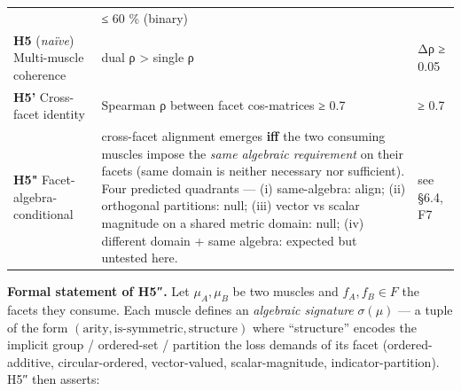 \begin{longtable}[]{@{}lll@{}}
\begin{minipage}[t]{0.52\columnwidth}
\end{minipage} & \begin{minipage}[t]{0.29\columnwidth}\raggedright
≤ 60 \% (binary)\strut
\end{minipage}\tabularnewline
\begin{minipage}[t]{0.10\columnwidth}\raggedright
\textbf{H5} (\emph{naïve}) Multi-muscle coherence\strut
\end{minipage} & \begin{minipage}[t]{0.52\columnwidth}\raggedright
dual ρ \textgreater{} single ρ\strut
\end{minipage} & \begin{minipage}[t]{0.29\columnwidth}\raggedright
Δρ ≥ 0.05\strut
\end{minipage}\tabularnewline
\begin{minipage}[t]{0.10\columnwidth}\raggedright
\textbf{H5'} Cross-facet identity\strut
\end{minipage} & \begin{minipage}[t]{0.52\columnwidth}\raggedright
Spearman ρ between facet cos-matrices ≥ 0.7\strut
\end{minipage} & \begin{minipage}[t]{0.29\columnwidth}\raggedright
≥ 0.7\strut
\end{minipage}\tabularnewline
\begin{minipage}[t]{0.10\columnwidth}\raggedright
\textbf{H5"} Facet-algebra-conditional\strut
\end{minipage} & \begin{minipage}[t]{0.52\columnwidth}\raggedright
cross-facet alignment emerges \textbf{iff} the two consuming muscles impose the \emph{same algebraic requirement} on their facets (same domain is neither necessary nor sufficient). Four predicted quadrants --- (i) same-algebra: align; (ii) orthogonal partitions: null; (iii) vector vs scalar magnitude on a shared metric domain: null; (iv) different domain + same algebra: expected but untested here.\strut
\end{minipage} & \begin{minipage}[t]{0.29\columnwidth}\raggedright
see §6.4, F7\strut
\end{minipage}\tabularnewline
\bottomrule
\end{longtable}

\textbf{Formal statement of H5″.} Let \(\mu_A, \mu_B\) be two muscles and
\(f_A, f_B \in F\) the facets they consume. Each muscle defines an
\emph{algebraic signature} \(\sigma(\mu)\) --- a tuple of the form
\((\text{arity}, \text{is-symmetric}, \text{structure})\) where
``structure'' encodes the implicit group / ordered-set / partition
the loss demands of its facet (ordered-additive, circular-ordered,
vector-valued, scalar-magnitude, indicator-partition). H5″ then
asserts:

